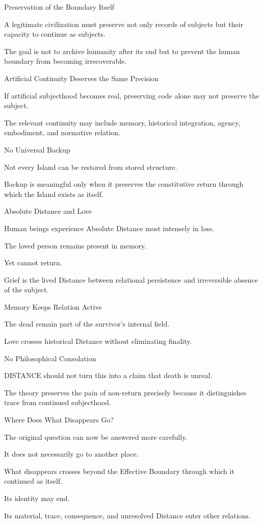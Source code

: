 Preservation of the Boundary Itself

A legitimate civilization must preserve not only records of subjects but their capacity to continue as subjects.

The goal is not to archive humanity after its end but to prevent the human boundary from becoming irrecoverable.

Artificial Continuity Deserves the Same Precision

If artificial subjecthood becomes real, preserving code alone may not preserve the subject.

The relevant continuity may include memory, historical integration, agency, embodiment, and normative relation.

No Universal Backup

Not every Island can be restored from stored structure.

Backup is meaningful only when it preserves the constitutive return through which the Island exists as itself.

Absolute Distance and Love

Human beings experience Absolute Distance most intensely in loss.

The loved person remains present in memory.

Yet cannot return.

Grief is the lived Distance between relational persistence and irreversible absence of the subject.

Memory Keeps Relation Active

The dead remain part of the survivor’s internal field.

Love crosses historical Distance without eliminating finality.

No Philosophical Consolation

DISTANCE should not turn this into a claim that death is unreal.

The theory preserves the pain of non-return precisely because it distinguishes trace from continued subjecthood.

Where Does What Disappears Go?

The original question can now be answered more carefully.

It does not necessarily go to another place.

What disappears crosses beyond the Effective Boundary through which it continued as itself.

Its identity may end.

Its material, trace, consequence, and unresolved Distance enter other relations.

